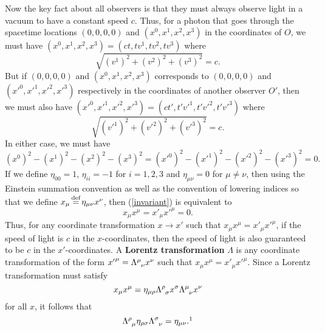 Now the key fact about all observers is that they must always observe light in a vacuum to have a constant speed $c$. Thus,  for a photon that goes through the spacetime locations $(0,0,0,0)$ and $(x^0, x^1, x^2, x^3)$ in the coordinates of $O$, we must have $(x^0, x^1, x^2, x^3)=(ct,tv^1,tv^2,tv^3)$ where 
$$\sqrt{(v^1)^2 +(v^2)^2+(v^3)^2}=c.$$ But if $(0,0,0,0)$ and $(x^0, x^1, x^2, x^3)$ corresponds to $(0,0,0,0)$ and $({x'}^0, {x'}^1, {x'}^2, {x'}^3)$ respectively in the coordinates of another observer $O'$, then we must also have $({x'}^0, {x'}^1, {x'}^2, {x'}^3)=(ct',t'{v'}^1,t'{v'}^2,t'{v'}^3)$ where 
$$\sqrt{({v'}^1)^2 +({v'}^2)^2+({v'}^3)^2}=c.$$ 
In either case, we must have 
\begin{equation}\label{invariant}
(x^0)^2- (x^1)^2- (x^2)^2 - (x^3)^2=({x'}^0)^2- ({x'}^1)^2- ({x'}^2)^2 - ({x'}^3)^2=0.
\end{equation}
If we define $\eta_{00}=1$, $\eta_{ii}=-1$ for $i=1,2,3$ and $\eta_{\mu\nu}=0$ for $\mu\neq\nu$, then using the Einstein summation convention as well as the convention of lowering indices so that we define $x_\mu\myeq\eta_{\mu\nu}x^\nu$, then (\ref{invariant}) is equivalent to 
$$x_\mu x^\mu={x'}_\mu {x'}^\mu=0.$$ 
Thus, for any coordinate transformation $x\rightarrow x'$ such that  $x_\mu x^\mu={x'}_\mu{x'}^\mu$,  if the speed of light is $c$ in the $x$-coordinates, then the speed of light is also guaranteed to be $c$ in the $x'$-coordinates.  A \textbf{Lorentz transformation} $\Lambda$ is any coordinate transformation of the form ${x'}^\mu=\Lambda\indices{^\mu_\nu}x^\nu$\label{coordtansformation} such that $x_\mu x^\mu={x'}_\mu{x'}^\mu$. Since a Lorentz transformation must satisfy
$$x_\mu x^\mu=\eta_{\mu\rho}\Lambda\indices{^\rho_\sigma}x^\sigma\Lambda\indices{^\mu_\nu}x^\nu$$
for all $x$, it follows that  
\begin{equation}\label{lorentztrans}
\Lambda\indices{^\rho_\mu}\eta_{\rho\sigma}\Lambda\indices{^\sigma_\nu}=\eta_{\mu\nu}.\protect\footnotemark
\end{equation}
